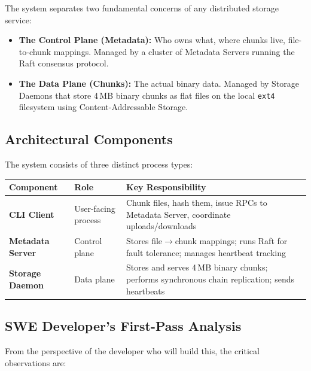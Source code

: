 \documentclass[12pt,a4paper]{article}
\begin{document}
The system separates two fundamental concerns of any distributed storage service:

\begin{itemize}[leftmargin=2em]
  \item \textbf{The Control Plane (Metadata):} Who owns what, where chunks live, file-to-chunk mappings. Managed by a cluster of Metadata Servers running the Raft consensus protocol.
  \item \textbf{The Data Plane (Chunks):} The actual binary data. Managed by Storage Daemons that store 4\,MB binary chunks as flat files on the local \texttt{ext4} filesystem using Content-Addressable Storage.
\end{itemize}

\subsection{Architectural Components}

The system consists of three distinct process types:

\begin{center}
\begin{tabular}{>{\bfseries}p{3.2cm} p{4.5cm} p{5.5cm}}
\toprule
Component & Role & Key Responsibility \\
\midrule
\textbf{CLI Client} & User-facing process & Chunk files, hash them, issue RPCs to Metadata Server, coordinate uploads/downloads \\
\addlinespace
\textbf{Metadata Server} & Control plane & Stores file$\to$chunk mappings; runs Raft for fault tolerance; manages heartbeat tracking \\
\addlinespace
\textbf{Storage Daemon} & Data plane & Stores and serves 4\,MB binary chunks; performs synchronous chain replication; sends heartbeats \\
\bottomrule
\end{tabular}
\end{center}

\subsection{SWE Developer's First-Pass Analysis}

From the perspective of the developer who will build this, the critical observations are:
\end{document}
